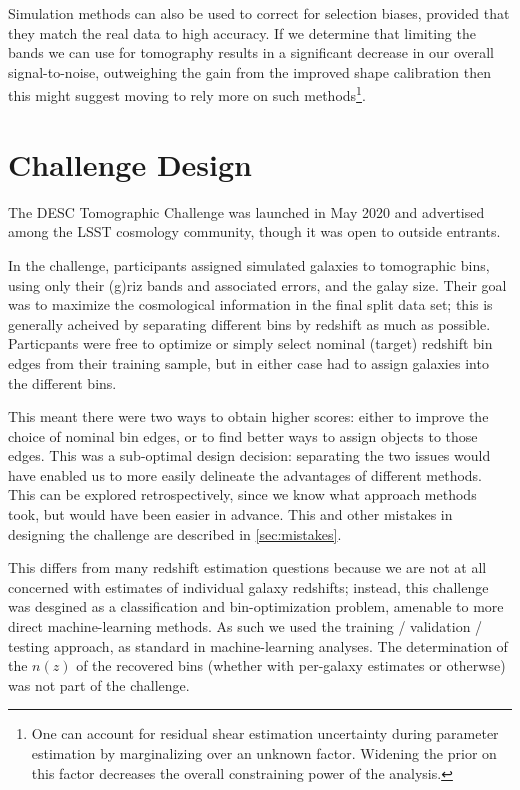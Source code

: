 \documentclass[twocolumn,twocolappendix]{aastex63}
\begin{document}
Simulation methods can also be used to correct for selection biases, provided that they match the
real data to high accuracy.  If we determine that limiting the bands we can use for tomography results
in a significant decrease in our overall signal-to-noise, outweighing the gain from the improved shape
calibration then this might suggest moving to rely more on such methods\footnote{One can account for
residual shear estimation uncertainty during parameter estimation by marginalizing over an unknown
factor.  Widening the prior on this factor decreases the overall constraining power of the analysis.}.


\section{Challenge Design}

The DESC Tomographic Challenge was launched in May 2020 and 
advertised among the LSST cosmology community, though it was open to outside entrants.

In the challenge, participants assigned simulated galaxies to tomographic bins,
using only their (g)riz bands and associated errors, and the galay size.  Their goal was to maximize the cosmological
information in the final split data set; this is generally acheived by separating different bins by 
redshift as much as possible.  Particpants were free to optimize or simply select nominal (target) 
redshift bin edges from their training sample, but in either case had to assign galaxies into the 
different bins.

This meant there were two ways to obtain higher scores: either to improve the choice of nominal bin
edges, or to find better ways to assign objects to those edges.  This was a sub-optimal design decision:
separating the two issues would have enabled us to more easily delineate the advantages of different methods. 
This can be explored retrospectively, since we know what approach methods took, but would have been
easier in advance.  This and other mistakes in designing the challenge are described in \autoref{sec:mistakes}.

This differs from many redshift estimation questions because we are not at all concerned with estimates
of individual galaxy redshifts; instead, this challenge was desgined as a classification and bin-optimization
problem, amenable to more direct machine-learning methods.  As such we used the training / validation / testing
approach, as standard in machine-learning analyses.
The determination of the $n(z)$ of the recovered
bins (whether with per-galaxy estimates or otherwse) was not part of the challenge.
\end{document}
